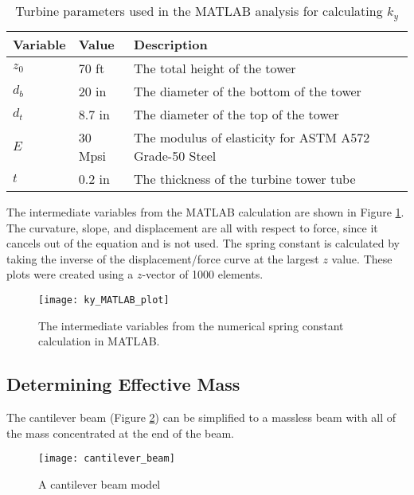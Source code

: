 \begin{table}[]
\caption{Turbine parameters used in the MATLAB analysis for calculating $k_y$}
\label{t:MATLAB_ky_variables}
\vspace*{0.2in}
\begin{tabular}{|m{1in}|m{1in}|m{4in}|}
\hline
\rowcolor[HTML]{EFEFEF} 
\textbf{Variable} & \textbf{Value} & \textbf{Description} \\ \hline
$z_0$ & 70 ft & The total height of the tower \\ \hline
$d_b$ & 20 in & The diameter of the bottom of the tower \\ \hline
$d_t$ & 8.7 in & The diameter of the top of the tower \\ \hline
$E$ & 30 Mpsi & The modulus of elasticity for ASTM A572 Grade-50 Steel \\ \hline
$t$ & 0.2 in & The thickness of the turbine tower tube \\ \hline
\end{tabular}
\end{table}

The intermediate variables from the MATLAB calculation are shown in Figure  \ref{fig:ky_MATLAB_plot}.  The curvature, slope, and displacement are all with respect to force, since it cancels out of the equation and is not used.  The spring constant is calculated by taking the inverse of the displacement/force curve at the largest $z$ value.  These plots were created using a $z$-vector of 1000 elements.

\begin{figure}
	\centering
	\texttt{[image: ky\_MATLAB\_plot]}
	\decoRule
	\caption{The intermediate variables from the numerical spring constant calculation in MATLAB.}
	\label{fig:ky_MATLAB_plot}
\end{figure}
\FloatBarrier



\subsection{Determining Effective Mass}
The cantilever beam (Figure \ref{fig:cantilever_beam}) can be simplified to a massless beam with all of the mass concentrated at the end of the beam.

\begin{figure}
	\centering
	\texttt{[image: cantilever\_beam]}
	\decoRule
	\caption{A cantilever beam model \cite{cantilever_beam_ref}}
	\label{fig:cantilever_beam}
\end{figure}

